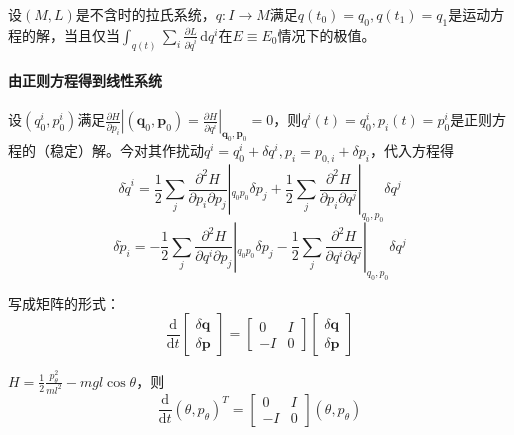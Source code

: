 \documentclass{ctexbook}
\begin{document}
\begin{Cor}[Maupertuis]
  设$(M,L)$是不含时的拉氏系统，$q:I\to M$满足$q(t_0)=q_0, q(t_1)=q_1$是运动方程的解，当且仅当$\int_{q(t)}^{} \sum\limits_i^{}\frac{\partial L}{\partial \dot{q}^{i}} \,\mathrm{d}q^i$在$E\equiv E_0$情况下的极值。
\end{Cor}

\paragraph{由正则方程得到线性系统}
设$(q_0^i, p_0^i)$满足$\frac{\partial H}{\partial p_{i}}|(\bm{q}_0, \bm{p}_0)= \frac{\partial H}{\partial q^{i}}|_{\bm{q}_0, \bm{p}_0}=0$，则$q^i(t)=q_0^i, p_i(t)=p_0^i$是正则方程的（稳定）解。今对其作扰动$q^i= q_0^i+\delta q^i, p_i= p_{0,i}+\delta p_i$，代入方程得
\begin{equation*}
\delta \dot{q}^i= \frac{1}{2}\sum\limits_j^{} \frac{\partial^2 H }{\partial p_i \partial p_j}|_{q_0 p_0}\delta p_j +\frac{1}{2} \sum\limits_j^{} \frac{\partial^2 H }{\partial p_i \partial q^j}|_{q_0,p_0}\delta q^{j}
\end{equation*}
\begin{equation*}
\delta \dot{p}_i= -\frac{1}{2}\sum\limits_j^{} \frac{\partial^2 H }{\partial q^i \partial p_j}|_{q_0 p_0}\delta p_j -\frac{1}{2} \sum\limits_j^{} \frac{\partial^2 H }{\partial q^i \partial q^j}|_{q_0,p_0}\delta q^{j}
\end{equation*}

写成矩阵的形式：
\begin{equation*}
\frac{\mathrm{d}}{\mathrm{d}t}
\begin{bmatrix}
  \delta \bm{q}\\ \delta \bm{p}
\end{bmatrix}=
\begin{bmatrix}
  0& I\\ -I & 0
\end{bmatrix}
\begin{bmatrix}
  \delta \bm{q}\\ \delta \bm{p}
\end{bmatrix}
\end{equation*}

\begin{Eg}[单摆]
  $H=\frac{1}{2}\frac{p_{\theta}^2}{ml^2}-mgl \cos\theta$，则
  \begin{equation*}
\frac{\mathrm{d}}{\mathrm{d}t}(\theta, p_{\theta})^T=
\begin{bmatrix}
  0&I\\ -I& 0
\end{bmatrix}(\theta, p_{\theta})
  \end{equation*}
\end{Eg}
\end{document}
